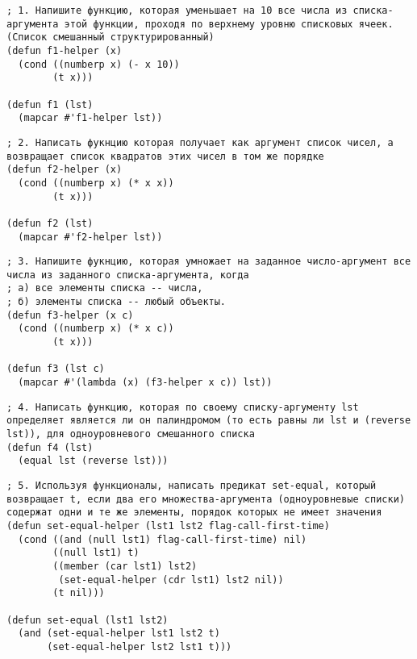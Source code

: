 \documentclass[a4paper,oneside,14pt]{extarticle}
\begin{document}

\setcounter{page}{2}
\renewcommand{\contentsname}{СОДЕРЖАНИЕ}


\begin{lstlisting}
; 1. Напишите функцию, которая уменьшает на 10 все числа из списка-аргумента этой функции, проходя по верхнему уровню списковых ячеек. (Список смешанный структурированный)
(defun f1-helper (x)
  (cond ((numberp x) (- x 10))
        (t x)))

(defun f1 (lst)
  (mapcar #'f1-helper lst))
\end{lstlisting}

\begin{lstlisting}
; 2. Написать фукнцию которая получает как аргумент список чисел, а возвращает список квадратов этих чисел в том же порядке
(defun f2-helper (x)
  (cond ((numberp x) (* x x))
        (t x)))

(defun f2 (lst)
  (mapcar #'f2-helper lst))
\end{lstlisting}

\begin{lstlisting}
; 3. Напишите фукнцию, которая умножает на заданное число-аргумент все числа из заданного списка-аргумента, когда
; а) все элементы списка -- числа,
; б) элементы списка -- любый объекты.
(defun f3-helper (x c)
  (cond ((numberp x) (* x c))
        (t x)))

(defun f3 (lst c)
  (mapcar #'(lambda (x) (f3-helper x c)) lst))
\end{lstlisting}

\begin{lstlisting}
; 4. Написать функцию, которая по своему списку-аргументу lst определяет является ли он палиндромом (то есть равны ли lst и (reverse lst)), для одноуровневого смешанного списка
(defun f4 (lst)
  (equal lst (reverse lst)))
\end{lstlisting}

\begin{lstlisting}
; 5. Используя функционалы, написать предикат set-equal, который возвращает t, если два его множества-аргумента (одноуровневые списки) содержат одни и те же элементы, порядок которых не имеет значения
(defun set-equal-helper (lst1 lst2 flag-call-first-time)
  (cond ((and (null lst1) flag-call-first-time) nil)
        ((null lst1) t)
        ((member (car lst1) lst2)
         (set-equal-helper (cdr lst1) lst2 nil))
        (t nil)))

(defun set-equal (lst1 lst2)
  (and (set-equal-helper lst1 lst2 t)
       (set-equal-helper lst2 lst1 t)))
\end{lstlisting}
\end{document}
